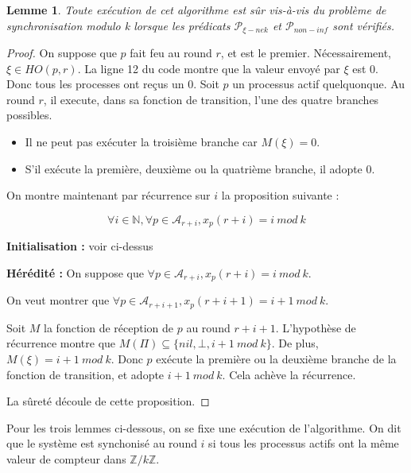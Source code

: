 \documentclass{article}
\newtheorem{lemma}{Lemme}
\begin{document}
\begin{lemma}
	Toute exécution de cet algorithme est sûr vis-à-vis du problème de synchronisation modulo k lorsque les prédicats $\mathcal{P}_{\xi-nek}$ et $\mathcal{P}_{non-inf}$ sont vérifiés.
\end{lemma}
\begin{proof}

	On suppose que $p$ fait feu au round $r$, et est le premier. Nécessairement, $\xi \in HO(p,r)$.
	La ligne 12 du code montre que la valeur envoyé par $\xi$ est 0.
	Donc tous les processes ont reçus un 0. Soit $p$ un processus actif quelquonque. Au round $r$, il execute, dans sa fonction de transition, l'une des quatre branches possibles.
	\begin{itemize}

		\item Il ne peut pas exécuter la troisième branche car $M(\xi) = 0$.
		\item S'il exécute la première, deuxième ou la quatrième branche, il adopte 0.

	\end{itemize}

	On montre maintenant par récurrence sur $i$ la proposition suivante :

	$$\forall i \in \mathds{N}, \forall p \in \mathcal{A}_{r+i}, x_p(r+i) = i~mod~k$$

	\textbf{Initialisation : } voir ci-dessus

	\textbf{Hérédité :}
	On suppose que $\forall p \in \mathcal{A}_{r+i}, x_p(r+i) = i~mod~k$.

	On veut montrer que $\forall p \in \mathcal{A}_{r+i+1}, x_p(r+i+1) = i+1~mod~k$.

	Soit $M$ la fonction de réception de $p$ au round $r+i+1$.
	L'hypothèse de récurrence montre que $M(\Pi) \subseteq \{nil, \bot, i+1~mod~k\}$.
	De plus, $M(\xi) = i+1~mod~k$. Donc $p$ exécute la première ou la deuxième branche de la fonction de transition, et adopte $i+1~mod~k$.
	Cela achève la récurrence.

	La sûreté découle de cette proposition.

\end{proof}

Pour les trois lemmes ci-dessous, on se fixe une exécution de l'algorithme.
On dit que le système est synchonisé au round $i$ si tous les processus actifs ont la même valeur de compteur dans $\mathds{Z}/k\mathds{Z}$.
\end{document}
